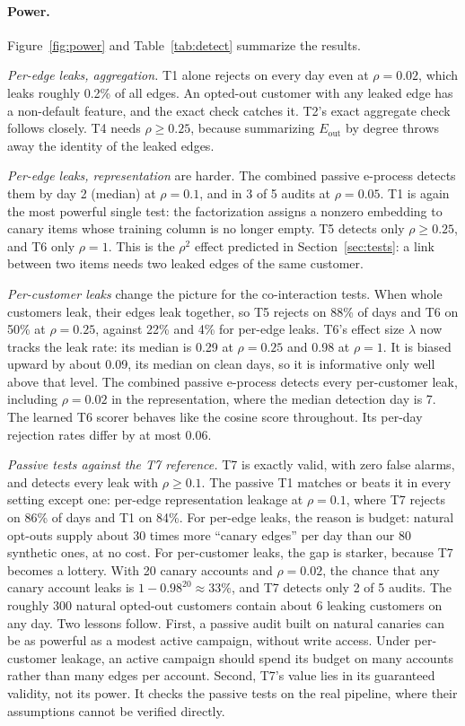 \documentclass[10pt,twocolumn,letterpaper]{article}
\theoremstyle{definition}
\newcommand{\Eout}{E_{\mathrm{out}}}
\begin{document}
\paragraph{Power.}
Figure~\ref{fig:power} and Table~\ref{tab:detect} summarize the results.

\emph{Per-edge leaks, aggregation.} T1 alone rejects on every day even at
$\rho=0.02$, which leaks roughly 0.2\% of all edges. An opted-out customer with
any leaked edge has a non-default feature, and the exact check catches it.
T2's exact aggregate check follows closely. T4 needs $\rho\ge 0.25$, because
summarizing $\Eout$ by degree throws away the identity of the leaked edges.

\emph{Per-edge leaks, representation} are harder. The combined passive
e-process detects them by day 2 (median) at $\rho=0.1$, and in 3 of 5 audits at
$\rho=0.05$. T1 is again the most powerful single test: the factorization
assigns a nonzero embedding to canary items whose training column is no
longer empty. T5 detects only $\rho\ge 0.25$, and T6 only $\rho=1$. This is the
$\rho^2$ effect predicted in Section~\ref{sec:tests}: a link between two items
needs two leaked edges of the same customer.

\emph{Per-customer leaks} change the picture for the co-interaction tests.
When whole customers leak, their edges leak together, so T5 rejects on 88\%
of days and T6 on 50\% at $\rho=0.25$, against 22\% and 4\% for per-edge leaks.
T6's effect size $\lambda$ now tracks the leak rate: its median is 0.29 at
$\rho=0.25$ and 0.98 at $\rho=1$. It is biased upward by about 0.09, its median on
clean days, so it is informative only well above that level. The combined
passive e-process detects every per-customer leak, including $\rho=0.02$ in the
representation, where the median detection day is 7. The learned T6 scorer
behaves like the cosine score throughout. Its per-day rejection rates differ
by at most 0.06.

\emph{Passive tests against the T7 reference.} T7 is exactly valid, with zero
false alarms, and detects every leak with $\rho\ge 0.1$. The passive T1 matches
or beats it in every setting except one: per-edge representation leakage at
$\rho=0.1$, where T7 rejects on 86\% of days and T1 on 84\%. For per-edge leaks,
the reason is budget: natural opt-outs supply about 30 times more ``canary
edges'' per day than our 80 synthetic ones, at no cost. For per-customer
leaks, the gap is starker, because T7 becomes a lottery. With 20 canary
accounts and $\rho=0.02$, the chance that any canary account leaks is
$1-0.98^{20}\approx 33\%$, and T7 detects only 2 of 5 audits. The roughly 300
natural opted-out customers contain about 6 leaking customers on any day.
Two lessons follow. First, a passive audit built on natural canaries can be
as powerful as a modest active campaign, without write access. Under
per-customer leakage, an active campaign should spend its budget on many
accounts rather than many edges per account. Second, T7's value lies in its
guaranteed validity, not its power. It checks the passive tests on the real
pipeline, where their assumptions cannot be verified directly.
\end{document}
